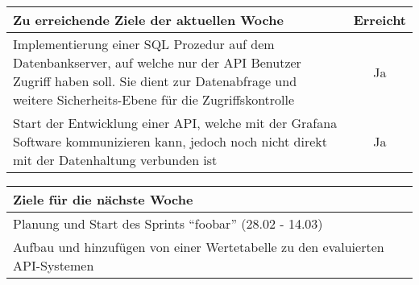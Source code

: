 \begin{tabularx}{\textwidth}{Xc}
    \arrayrulecolor{OliveGreen}
    \toprule
    {\bfseries Zu erreichende Ziele der aktuellen Woche} & {\bfseries Erreicht} \\
    \midrule[2pt]
    Implementierung einer SQL Prozedur auf dem Datenbankserver, auf welche nur
    der API Benutzer Zugriff haben soll. Sie dient zur Datenabfrage und
    weitere Sicherheits-Ebene für die Zugriffskontrolle  &  Ja  \\
    \rowcolor{OliveGreen!15}
    Start der Entwicklung einer API, welche mit der Grafana Software
    kommunizieren kann, jedoch noch nicht direkt mit der Datenhaltung verbunden
    ist  &  Ja  \\
    \bottomrule[2pt]
\end{tabularx}
%
\vspace{1cm}
%
\begin{tabularx}{\textwidth}{Xc}
    \arrayrulecolor{OliveGreen}
    \toprule
    {\bfseries Ziele für die nächste Woche}              &                      \\
    \midrule[2pt]
    Planung und Start des Sprints ``foobar'' (28.02 - 14.03)  &  \\
    \rowcolor{OliveGreen!15}
    Aufbau und hinzufügen von einer Wertetabelle zu den evaluierten
    API-Systemen  &  \\
\end{tabularx}
